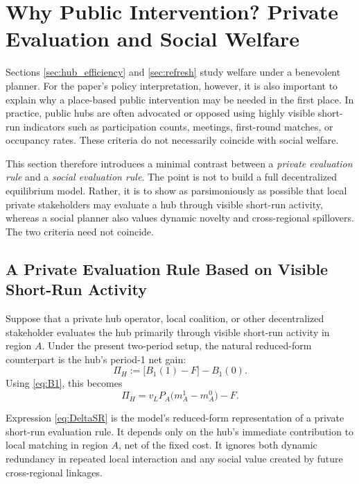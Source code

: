 \section{Why Public Intervention? Private Evaluation and Social Welfare}
\label{sec:short_run}

Sections \ref{sec:hub_efficiency} and \ref{sec:refresh} study welfare under a benevolent planner. For the paper's policy interpretation, however, it is also important to explain why a place-based public intervention may be needed in the first place. In practice, public hubs are often advocated or opposed using highly visible short-run indicators such as participation counts, meetings, first-round matches, or occupancy rates. These criteria do not necessarily coincide with social welfare.

This section therefore introduces a minimal contrast between a \emph{private evaluation rule} and a \emph{social evaluation rule}. The point is not to build a full decentralized equilibrium model. Rather, it is to show as parsimoniously as possible that local private stakeholders may evaluate a hub through visible short-run activity, whereas a social planner also values dynamic novelty and cross-regional spillovers. The two criteria need not coincide.

\subsection{A Private Evaluation Rule Based on Visible Short-Run Activity}

Suppose that a private hub operator, local coalition, or other decentralized stakeholder evaluates the hub primarily through visible short-run activity in region $A$. Under the present two-period setup, the natural reduced-form counterpart is the hub's period-1 net gain:
\begin{equation}
\Pi_H
:=
\bigl[B_1(1)-F\bigr]-B_1(0).
\label{eq:PiH}
\end{equation}
Using \eqref{eq:B1}, this becomes
\begin{equation}
\Pi_H
=
v_L P_A\bigl(m_A^1-m_A^0\bigr)-F.
\label{eq:DeltaSR}
\end{equation}

Expression \eqref{eq:DeltaSR} is the model's reduced-form representation of a private short-run evaluation rule. It depends only on the hub's immediate contribution to local matching in region $A$, net of the fixed cost. It ignores both dynamic redundancy in repeated local interaction and any social value created by future cross-regional linkages.

